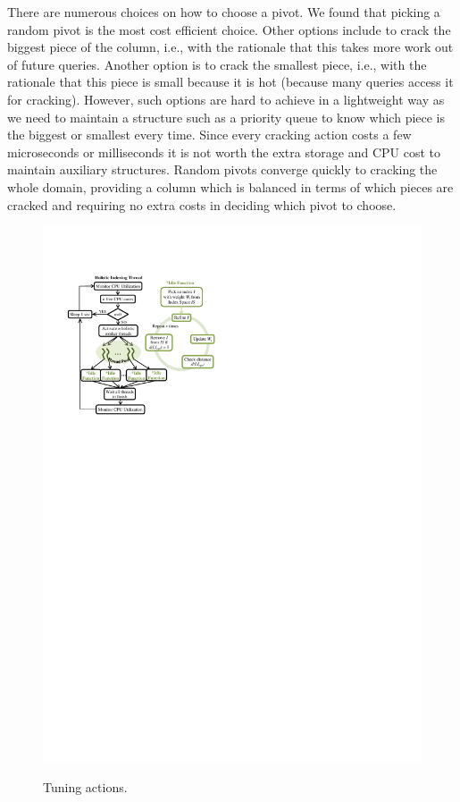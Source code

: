 There are numerous choices on how to choose a pivot. We found that picking a random pivot is the most cost efficient choice.
Other options include to crack the biggest piece of the column, i.e., with the rationale that this takes more work out of future queries.
Another option is to crack the smallest piece, i.e., with the rationale that this piece is small because it is hot (because many queries access it for cracking).
However, such options are hard to achieve in a lightweight way as we need to maintain a structure such as  a priority queue
to know which piece is the biggest or smallest every time. 
Since every cracking action costs a few microseconds or milliseconds it is not worth the extra storage and CPU cost to maintain auxiliary structures.
Random pivots converge quickly to cracking the whole domain,
providing a column which is balanced in terms of which pieces are cracked
and requiring no extra costs in deciding which pivot to choose. 


\begin{figure}
\begin{center}
\includegraphics[trim=1.3cm 18.5cm 0cm 2.7cm]{Figures/holistic/diagram}
\vspace{-0.6 in}
\caption{Tuning actions.}
\vspace{-0.7 cm}
\label{fig:diagram}
\end{center}
\end{figure}

